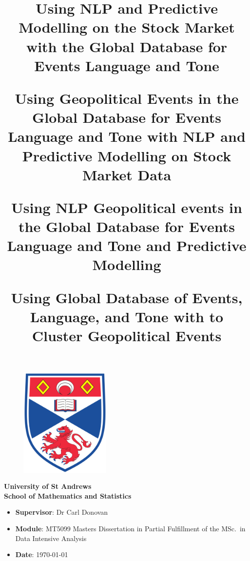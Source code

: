 \documentclass[a4paper]{article}
\begin{document}
\title{	Using NLP and Predictive Modelling on the Stock Market with the Global Database for Events Language and Tone


Using Geopolitical Events in the Global Database for Events Language and Tone with NLP and Predictive Modelling on Stock Market Data

Using NLP Geopolitical events in the Global Database for Events Language and Tone and Predictive Modelling 

Using Global Database of Events, Language, and Tone with to Cluster Geopolitical Events 

}
\author{}
\date{}
 \thispagestyle{empty}
	
	\begin{titlepage}
		\vspace{\fill}
		\maketitle
		 \thispagestyle{empty}
		\begin{figure}[H]
			\centering
			\includegraphics[width=0.4\textwidth]{Images/SchoolLogo.png}
		\end{figure}
		\begin{center}
			\Large\textbf{University of St Andrews}\\
			\vspace{1cm}
			\Large\textbf{School of Mathematics and Statistics}
		\end{center}
		
		\vspace{\fill}
		\Large%
		\begin{itemize}
			\renewcommand\labelitemi{--}
			\item[] \textbf{Supervisor}: Dr Carl Donovan  
			\item[] \textbf{Module}: MT5099 Masters Dissertation in Partial Fulfillment of the MSc.\ in Data Intensive Analysis
			\item[] \textbf{Date}: \today
		\end{itemize}
		\vspace{\fill}
	\end{titlepage}
\end{document}
